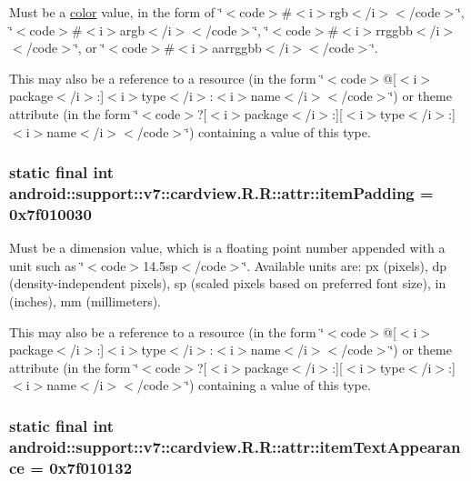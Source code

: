 Must be a \hyperlink{classandroid_1_1support_1_1v7_1_1cardview_1_1_r_1_1color}{color} value, in the form of \char`\"{}$<$code$>$\#$<$i$>$rgb$<$/i$>$$<$/code$>$\char`\"{}, \char`\"{}$<$code$>$\#$<$i$>$argb$<$/i$>$$<$/code$>$\char`\"{}, \char`\"{}$<$code$>$\#$<$i$>$rrggbb$<$/i$>$$<$/code$>$\char`\"{}, or \char`\"{}$<$code$>$\#$<$i$>$aarrggbb$<$/i$>$$<$/code$>$\char`\"{}. 

This may also be a reference to a resource (in the form \char`\"{}$<$code$>$@\mbox{[}$<$i$>$package$<$/i$>$:\mbox{]}$<$i$>$type$<$/i$>$:$<$i$>$name$<$/i$>$$<$/code$>$\char`\"{}) or theme attribute (in the form \char`\"{}$<$code$>$?\mbox{[}$<$i$>$package$<$/i$>$:\mbox{]}\mbox{[}$<$i$>$type$<$/i$>$:\mbox{]}$<$i$>$name$<$/i$>$$<$/code$>$\char`\"{}) containing a value of this type. \hypertarget{classandroid_1_1support_1_1v7_1_1cardview_1_1_r_1_1attr_5dcdfb800377892cf5fe1866c4266776}{
\subsubsection[{itemPadding}]{\setlength{\rightskip}{0pt plus 5cm}static final int android::support::v7::cardview.R.R::attr::itemPadding = 0x7f010030}}
\label{classandroid_1_1support_1_1v7_1_1cardview_1_1_r_1_1attr_5dcdfb800377892cf5fe1866c4266776}


Must be a dimension value, which is a floating point number appended with a unit such as \char`\"{}$<$code$>$14.5sp$<$/code$>$\char`\"{}. Available units are: px (pixels), dp (density-independent pixels), sp (scaled pixels based on preferred font size), in (inches), mm (millimeters). 

This may also be a reference to a resource (in the form \char`\"{}$<$code$>$@\mbox{[}$<$i$>$package$<$/i$>$:\mbox{]}$<$i$>$type$<$/i$>$:$<$i$>$name$<$/i$>$$<$/code$>$\char`\"{}) or theme attribute (in the form \char`\"{}$<$code$>$?\mbox{[}$<$i$>$package$<$/i$>$:\mbox{]}\mbox{[}$<$i$>$type$<$/i$>$:\mbox{]}$<$i$>$name$<$/i$>$$<$/code$>$\char`\"{}) containing a value of this type. \hypertarget{classandroid_1_1support_1_1v7_1_1cardview_1_1_r_1_1attr_b86bd1df4adaa529547f0f2ddbef315b}{
\subsubsection[{itemTextAppearance}]{\setlength{\rightskip}{0pt plus 5cm}static final int android::support::v7::cardview.R.R::attr::itemTextAppearance = 0x7f010132}}
\label{classandroid_1_1support_1_1v7_1_1cardview_1_1_r_1_1attr_b86bd1df4adaa529547f0f2ddbef315b}


